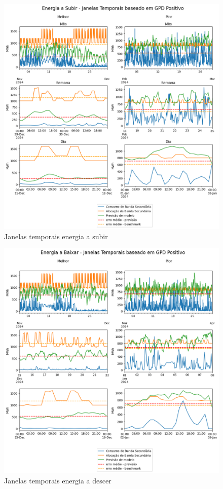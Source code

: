 \begin{figure}[H]
    \centering
    \includegraphics[width=\textwidth]{plots/alocacoes_temporais_upward_prediction_gpd_p.png}
    \caption{Janelas temporais energia a subir}
    \label{fig:mltimewindowsup}
\end{figure}


\begin{figure}[H]
    \centering
    \includegraphics[width=\textwidth]{plots/alocacoes_temporais_downward_prediction_gpd_p.png}
    \caption{Janelas temporais energia a descer}
    \label{fig:mltimewindowsdown}
\end{figure}

